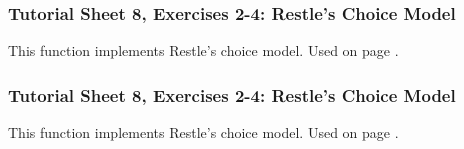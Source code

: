 \documentclass[../main/Notes.tex]{subfiles}
\begin{document}
{\subsubsection*{Tutorial Sheet 8, Exercises 2-4: Restle's Choice Model}\label{app:matlabcode_ex8_2_restle}
This function implements Restle's choice model. Used on page \pageref{back:matlabcode_ex8_2_restle}.


\subsubsection*{Tutorial Sheet 8, Exercises 2-4: Restle's Choice Model}\label{app:matlabcode_ex8_2_choiceplot}
This function implements Restle's choice model. Used on page \pageref{back:matlabcode_ex8_2_choiceplot}.

} %

\begingroup
\nocite{*}
\renewcommand{\refname}{Recommended Readings}
\renewcommand{\section}[2]{\subsection[Recommended Readings]{Recommended Readings}}

\endgroup
\end{document}
